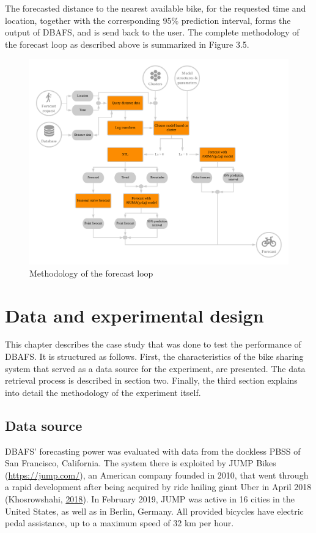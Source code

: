 \documentclass[12pt,oneside]{reedthesis}
\begin{document}
The forecasted distance to the nearest available bike, for the requested
time and location, together with the corresponding 95\% prediction
interval, forms the output of DBAFS, and is send back to the user. The
complete methodology of the forecast loop as described above is
summarized in Figure 3.5.
\begin{figure}[h]
\includegraphics[width=\textwidth]{Figures/Forecastloop} \caption{Methodology of the forecast loop}\label{fig:forecastloop}
\end{figure}
\chapter{Data and experimental
design}\label{data-and-experimental-design}

This chapter describes the case study that was done to test the
performance of DBAFS. It is structured as follows. First, the
characteristics of the bike sharing system that served as a data source
for the experiment, are presented. The data retrieval process is
described in section two. Finally, the third section explains into
detail the methodology of the experiment itself.

\section{Data source}\label{data-source}

DBAFS' forecasting power was evaluated with data from the dockless PBSS
of San Francisco, California. The system there is exploited by JUMP
Bikes (\url{https://jump.com/}), an American company founded in 2010,
that went through a rapid development after being acquired by ride
hailing giant Uber in April 2018 (Khosrowshahi,
\protect\hyperlink{ref-uber2018}{2018}). In February 2019, JUMP was
active in 16 cities in the United States, as well as in Berlin, Germany.
All provided bicycles have electric pedal assistance, up to a maximum
speed of 32 km per hour.
\end{document}
